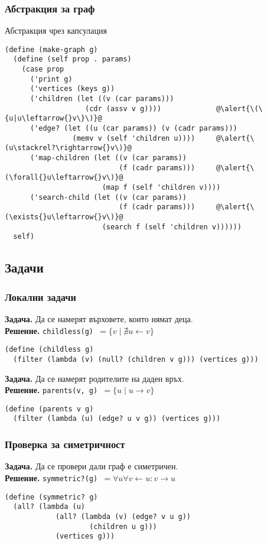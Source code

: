 \documentclass[alsotrans]{beamerswitch}
\begin{document}
\begin{frame}[fragile]
  \frametitle{Абстракция за граф}

  Абстракция чрез капсулация
  \scriptsize
\begin{lstlisting}
(define (make-graph g)
  (define (self prop . params)
    (case prop
      ('print g)
      ('vertices (keys g))
      ('children (let ((v (car params)))
                   (cdr (assv v g))))             @\alert{\(\{u|u\leftarrow{}v\}\)}@
      ('edge? (let ((u (car params)) (v (cadr params)))
                (memv v (self 'children u))))     @\alert{\(u\stackrel?\rightarrow{}v\)}@
      ('map-children (let ((v (car params))
                           (f (cadr params)))     @\alert{\(\forall{}u\leftarrow{}v\)}@
                       (map f (self 'children v))))
      ('search-child (let ((v (car params))
                           (f (cadr params)))     @\alert{\(\exists{}u\leftarrow{}v\)}@
                       (search f (self 'children v))))))
  self)
\end{lstlisting}
\end{frame}

\subsection{Задачи}

\begin{frame}[fragile]
  \frametitle{Локални задачи}

  \small
  \textbf{Задача. }Да се намерят върховете, които нямат деца.\\
  \pause
  \textbf{Решение. }\tt{childless(g)} $ = \{v\;|\;\nexists u \leftarrow v \}$
  \pause
\begin{lstlisting}
(define (childless g)
  (filter (lambda (v) (null? (children v g))) (vertices g)))
\end{lstlisting}
  \pause
  \vspace{2ex}
  \textbf{Задача. }Да се намерят родителите на даден връх.\\
  \pause
  \textbf{Решение. }\tt{parents(v, g)} $ = \{u\;|\;u \rightarrow v \}$
  \pause
\begin{lstlisting}
(define (parents v g)
  (filter (lambda (u) (edge? u v g)) (vertices g)))
\end{lstlisting}
\end{frame}

\begin{frame}[fragile]
  \frametitle{Проверка за симетричност}
  \textbf{Задача. }Да се провери дали граф е симетричен.\\
  \pause
  \textbf{Решение. }\tt{symmetric?(g)} $ = \forall u\forall v\leftarrow u: v\rightarrow u$
  \pause
\begin{lstlisting}
(define (symmetric? g)
  (all? (lambda (u)
            (all? (lambda (v) (edge? v u g))
                    (children u g)))
            (vertices g)))
\end{lstlisting}
\end{frame}
\end{document}
